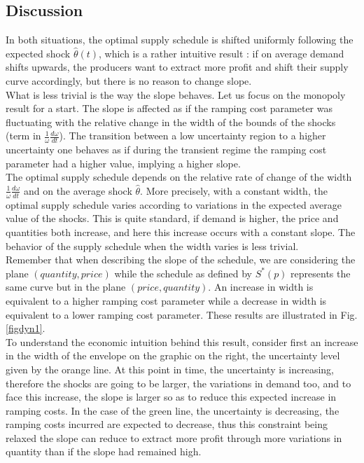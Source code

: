 \subsection{Discussion}

In both situations, the optimal supply schedule is shifted uniformly following the expected shock $\hat{\theta}(t)$, which is a rather intuitive result : if on average demand shifts upwards, the producers want to extract more profit and shift their supply curve accordingly, but there is no reason to change slope.\\

What is less trivial is the way the slope behaves. Let us focus on the monopoly result for a start. The slope is affected as if the ramping cost parameter was fluctuating with the relative change in the width of the bounds of the shocks (term in $\frac{1}{\omega}\frac{d\omega}{dt} $). The transition between a low uncertainty region to a higher uncertainty one behaves as if during the transient regime the ramping cost parameter had a higher value, implying a higher slope. \\
         
The optimal supply schedule depends on the relative rate of change of the width $\frac{1}{\omega}\frac{d\omega}{dt}$ and on the average shock $\hat{\theta}$. More precisely, with a constant width, the optimal supply schedule varies according to variations in the expected average value of the shocks. This is quite standard, if demand is higher, the price and quantities both increase, and here this increase occurs with a constant slope. The behavior of the supply schedule when the width varies is less trivial. \\

Remember that when describing the slope of the schedule, we are considering the plane $(quantity, price)$ while the schedule as defined by $S^*(p)$ represents the same curve but in the plane $(price, quantity)$. An increase in width is equivalent to a higher ramping cost parameter while a decrease in width is equivalent to a lower ramping cost parameter. These results are illustrated in Fig. \ref{figdyn1}. \\

To understand the economic intuition behind this result, consider first an increase in the width of the envelope on the graphic on the right, the uncertainty level given by the orange line. At this point in time, the uncertainty is increasing, therefore the shocks are going to be larger, the variations in demand too, and to face this increase, the slope is larger so as to reduce this expected increase in ramping costs. In the case of the green line, the uncertainty is decreasing, the ramping costs incurred are expected to decrease, thus this constraint being relaxed the slope can reduce to extract more profit through more variations in quantity than if the slope had remained high.\\

